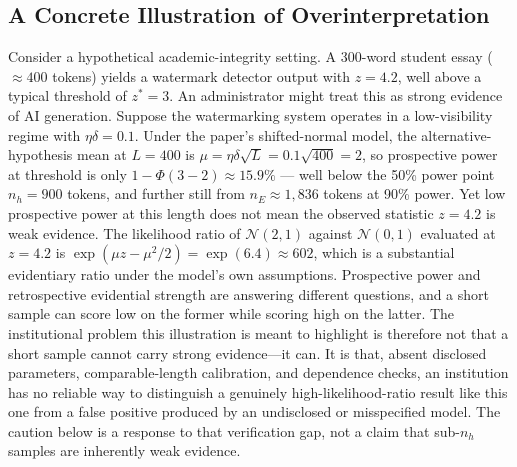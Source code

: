 \documentclass[11pt]{article}
\begin{document}
\subsection{A Concrete Illustration of Overinterpretation}
Consider a hypothetical academic-integrity setting. A 300-word student essay
($\approx 400$ tokens) yields a watermark detector output with $z = 4.2$, well
above a typical threshold of $z^* = 3$. An administrator might treat this as strong
evidence of AI generation. Suppose the watermarking system operates in a
low-visibility regime with $\eta\delta = 0.1$. Under the paper's shifted-normal
model, the alternative-hypothesis mean at $L=400$ is $\mu = \eta\delta\sqrt{L} =
0.1\sqrt{400} = 2$, so prospective power at threshold is only
$1-\Phi(3-2)\approx 15.9\%$ --- well below the 50\% power point $n_h = 900$ tokens,
and further still from $n_E \approx 1{,}836$ tokens at 90\% power.
Yet low prospective power at this length does not mean the observed statistic
$z=4.2$ is weak evidence. The likelihood ratio of $\mathcal{N}(2,1)$ against
$\mathcal{N}(0,1)$ evaluated at $z=4.2$ is $\exp(\mu z - \mu^2/2) = \exp(6.4)
\approx 602$, which is a substantial evidentiary ratio under the model's own
assumptions. Prospective power and retrospective evidential strength are answering
different questions, and a short sample can score low on the former while scoring
high on the latter.
The institutional problem this illustration is meant to highlight is therefore not
that a short sample cannot carry strong evidence---it can. It is that, absent
disclosed parameters, comparable-length calibration, and dependence checks, an
institution has no reliable way to distinguish a genuinely high-likelihood-ratio
result like this one from a false positive produced by an undisclosed or
misspecified model. The caution below is a response to that verification gap, not
a claim that sub-$n_h$ samples are inherently weak evidence.
\end{document}
